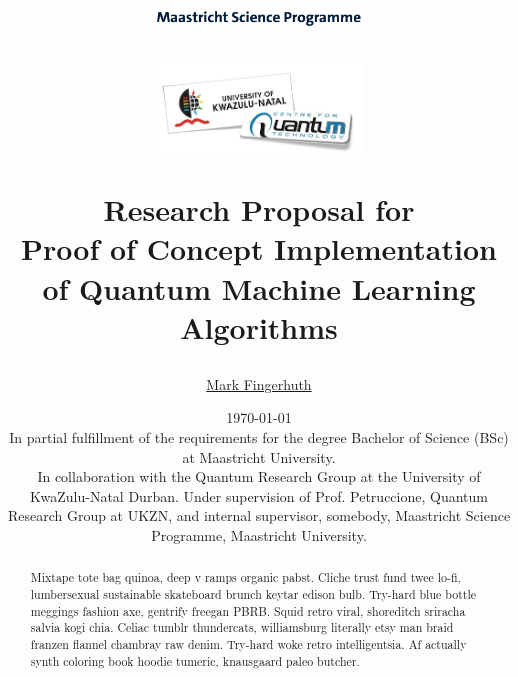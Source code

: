 \documentclass[a4paper]{article}
\begin{document}
\title{
\vspace{1cm}
\begin{figure}[!ht]
\centering
\includegraphics[width=0.5\textwidth]{MSC2.png}
\end{figure}
\vspace{0.3cm}
\begin{figure}[!ht]
\centering
\includegraphics[width=0.5\textwidth]{logo.jpeg}
\end{figure}
\vspace{2cm}
\Huge{\bf{Research Proposal for} \\ Proof of Concept Implementation of Quantum Machine Learning Algorithms \\}}
\vspace{3cm}
\author{\Large \href{mailto:m.fingerhuth@student.maastrichtuniversity.nl}{Mark Fingerhuth}
}
\date{
\today \\
\vspace{2.0cm}
In partial fulfillment of the requirements for the degree Bachelor of Science (BSc) at Maastricht University. \\
\vspace{1cm}
In collaboration with the Quantum Research Group at the University of KwaZulu-Natal Durban. Under supervision of Prof. Petruccione, Quantum Research Group at UKZN, and internal supervisor, somebody, Maastricht Science Programme, Maastricht University.
}
\maketitle
\setlength{\parindent}{0pt}


\vspace{10.0cm}
\begin{abstract}
Mixtape tote bag quinoa, deep v ramps organic pabst. Cliche trust fund twee lo-fi, lumbersexual sustainable skateboard brunch keytar edison bulb. Try-hard blue bottle meggings fashion axe, gentrify freegan PBRB. Squid retro viral, shoreditch sriracha salvia kogi chia. Celiac tumblr thundercats, williamsburg literally etsy man braid franzen flannel chambray raw denim. Try-hard woke retro intelligentsia. Af actually synth coloring book hoodie tumeric, knausgaard paleo butcher.

\end{abstract}
	\newpage
	\tableofcontents
	\newpage
\end{document}
